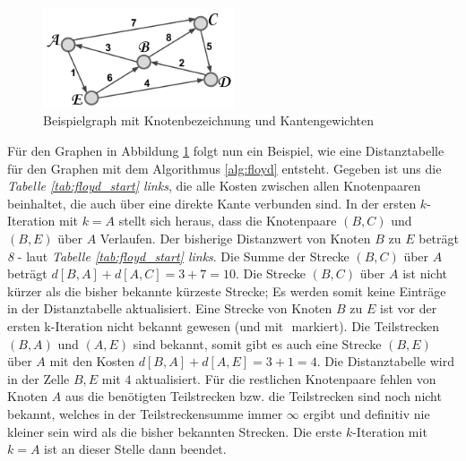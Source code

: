 \documentclass[12pt]{article}
\begin{document}
\begin{figure}[ht]
	\begin{center}
	\includegraphics[width=160pt]{pics/pdf/003_Floyd_Graph.pdf}
	\caption{Beispielgraph mit Knotenbezeichnung und Kantengewichten}
	\label{pic:floyd_graph}
	\end{center}
\end{figure}

Für den Graphen in Abbildung \ref{pic:floyd_graph} folgt nun ein Beispiel, wie eine Distanztabelle für den Graphen mit dem Algorithmus \ref{alg:floyd} entsteht. Gegeben ist uns die \textit{Tabelle \ref{tab:floyd_start} links}, die alle Kosten zwischen allen Knotenpaaren beinhaltet, die auch über eine direkte Kante verbunden sind. In der ersten $k$-Iteration mit $k = A$ stellt sich heraus, dass die Knotenpaare $(B,C)$ und $(B,E)$ über $A$ Verlaufen. Der bisherige Distanzwert von Knoten $B$ zu $E$ beträgt \textit{8} - laut \textit{Tabelle \ref{tab:floyd_start} links}. Die Summe der Strecke $(B,C)$ über $A$ beträgt $d[B,A] + d[A,C] = 3 + 7 = 10$. Die Strecke $(B,C)$ über $A$ ist nicht kürzer als die bisher bekannte kürzeste Strecke; Es werden somit keine Einträge in der Distanztabelle aktualisiert. Eine Strecke von Knoten $B$ zu $E$ ist vor der ersten k-Iteration nicht bekannt gewesen (und mit $ $ markiert). Die Teilstrecken $(B,A)$ und $(A,E)$ sind bekannt, somit gibt es auch eine Strecke $(B,E)$ über $A$ mit den Kosten $d[B,A] + d[A,E] = 3 + 1 = 4$. Die Distanztabelle wird in der Zelle $B,E$ mit $4$ aktualisiert. Für die restlichen Knotenpaare fehlen von Knoten $A$ aus die benötigten Teilstrecken bzw. die Teilstrecken sind noch nicht bekannt, welches in der Teilstreckensumme immer $\infty$ ergibt und definitiv nie kleiner sein wird als die bisher bekannten Strecken. Die erste $k$-Iteration mit $k = A$ ist an dieser Stelle dann beendet.
\end{document}
